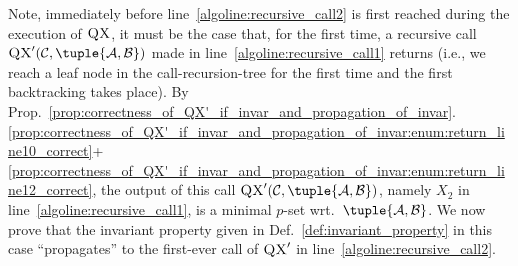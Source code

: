\documentclass[]{elsarticle}
\newcommand{\scQX}{{\textsc{QX}}}
\newcommand{\ma}{\mathcal{A}}
\newcommand{\mb}{\mathcal{B}}
\newcommand{\mc}{\mathcal{C}}
\newcommand{\ba}{\bar{\ma}}
\newcommand{\bb}{\bar{\mb}}
\newcommand{\bc}{\bar{\mc}}
\newcommand{\Inv}{\mathsf{Invar}}
\newtheorem{proposition}{Proposition}[]{}
\begin{document}
	\noindent Note, immediately before line~\ref{algoline:recursive_call2} is first reached during the execution of $\scQX$, it must be the case that, for the first time, a recursive call 
	$\scQX'(\mc,\tuple{\ma,\mb})$ 
	made in line~\ref{algoline:recursive_call1} returns (i.e., we reach a leaf node in the call-recursion-tree for the first time and the first backtracking takes place). By Prop.~\ref{prop:correctness_of_QX'_if_invar_and_propagation_of_invar}.\ref{prop:correctness_of_QX'_if_invar_and_propagation_of_invar:enum:return_line10_correct}+\ref{prop:correctness_of_QX'_if_invar_and_propagation_of_invar:enum:return_line12_correct}, the output of this call $\scQX'(\mc,\tuple{\ma,\mb})$, namely $X_2$ in line~\ref{algoline:recursive_call1}, is a minimal $p$-set wrt.\ $\tuple{\ma,\mb}$. We now prove that the invariant property given in Def.~\ref{def:invariant_property} in this case ``propagates'' to the first-ever call of $\scQX'$ in line~\ref{algoline:recursive_call2}.
\end{document}

